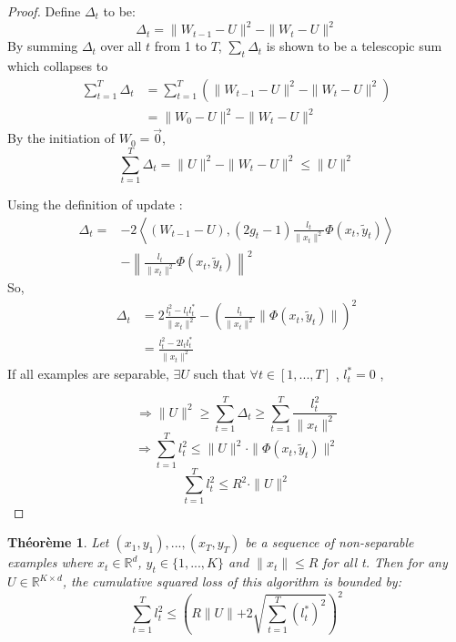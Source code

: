 \documentclass[twocolumn]{article}
\newtheorem{theorem}{Théorème}
\begin{document}
\begin{proof}
	Define $\Delta_t$ to be:
	\[\Delta_t = \parallel{W_{t-1}-U}\parallel^2-\parallel{W_t-U}\parallel^2\]
	By summing $\Delta_t$ over all $t$ from 1 to $T$,  $\sum_t \Delta_t$ is shown to be a telescopic sum which collapses to
	\begin{align}
    \sum_{t=1}^{T}\Delta_t &= \sum_{t=1}^{T} \left( \parallel{W_{t-1} - U}\parallel^2-\parallel{W_t - U}\parallel^2 \right)\nonumber\\ 
    &= \parallel{W_0 - U}\parallel^2-\parallel{W_t-U}\parallel^2\nonumber
	\end{align}	
	By the initiation of $W_0 = \vec{0}$, 
	\begin{equation}
	\label{equa:delta}
	\sum_{t=1}^{T}\Delta_t = \parallel{U}\parallel^2 - \parallel{W_t-U}\parallel^2 \leqslant \parallel{U}\parallel^2 
	\end{equation}
	
	Using the definition of update : %
	\begin{align}
	\Delta_t =& -2\left\langle (W_{t-1} - U), (2g_t-1)\frac{l_t}{\parallel{x_t}\parallel^2}\Phi(x_t,\tilde{y}_t)\right\rangle \nonumber\\
	&- \left\| \frac{l_t}{\parallel{x_t}\parallel^2}\Phi(x_t,\tilde{y}_t)\right\|^2
	\nonumber
	\end{align}
	So, 
	\begin{align}
	\Delta_t &= 2\frac{l_t^2 - l_t l_t^{\ast}}{\parallel{x_t}\parallel^2}-\left( \frac{l_t}{\parallel{x_t}\parallel^2}\parallel{\Phi(x_t,\tilde{y}_t)}\parallel \right)^2\nonumber\\
	&= \frac{l_t^2-2l_t l_t^{\ast}}{\parallel x_t\parallel^2}\nonumber
	\end{align}
	If all examples are separable, $\exists U$ such that $\forall t \in [1,...,T]$ , $l_t^{\ast} = 0$ ,
	
	\[\Rightarrow \parallel{U}\parallel^2 \geqslant \sum_{t=1}^{T}\Delta_t \geqslant \sum_{t=1}^{T}  \frac{l_t^2}{\parallel{x_t}\parallel^2}\]
	\[\Rightarrow \sum_{t=1}^{T} l_t^2 \leqslant\parallel{U}\parallel^2 \cdot \parallel{\Phi(x_t,\tilde{y}_t)}\parallel^2\]
	\[\sum_{t=1}^{T} l_t^2 \leqslant R^2 \cdot \parallel{U}\parallel^2\]
\end{proof}
\begin{theorem}
	\label{theo:BPAT2}
	Let $(x_1,y_1),...,(x_T,y_T) $ be a sequence of non-separable examples where  $x_t\in \mathbb{R}^d$, $y_t \in \{1,...,K\}$ and $\parallel{x_t}\parallel \leqslant R$ for all t. Then for any  $U \in \mathbb{R}^{K\times d}$, the cumulative squared loss of this algorithm is bounded by:
	\[\sum_{t=1}^{T}l_t^2 \leqslant \left(R\parallel{U}\parallel+2 \sqrt{\sum_{t=1}^{T}(l_t^{\ast})^2}\right)^2 \]
\end{theorem}
\end{document}
